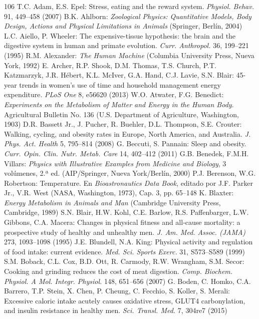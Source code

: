 \documentclass[12pt]{book}
\begin{document}
\begin{thebibliography}{106}
   T.C. Adam, E.S. Epel: Stress, eating and the reward system. \textit{Physiol. Behav.} 91, 449--458 (2007)
   B.K. Ahlborn: \textit{Zoological Physics: Quantitative Models, Body Design, Actions and Physical Limitations in Animals} (Springer, Berlín, 2004)
   L.C. Aiello, P. Wheeler: The expensive-tissue hypothesis: the brain and the digestive system in human and primate evolution. \textit{Curr. Anthropol.} 36, 199--221 (1995)
   R.M. Alexander: \textit{The Human Machine} (Columbia University Press, Nueva York, 1992)
   E. Archer, R.P. Shook, D.M. Thomas, T.S. Church, P.T. Katzmarzyk, J.R. Hébert, K.L. McIver, G.A. Hand, C.J. Lavie, S.N. Blair: 45-year trends in women's use of time and household management energy expenditure. \textit{PLoS One} 8, e56620 (2013)
   W.O. Atwater, F.G. Benedict: \textit{Experiments on the Metabolism of Matter and Energy in the Human Body}. Agricultural Bulletin No. 136 (U.S. Department of Agriculture, Washington, 1903)
   D.R. Bassett Jr., J. Pucher, R. Buehler, D.L. Thompson, S.E. Crouter: Walking, cycling, and obesity rates in Europe, North America, and Australia. \textit{J. Phys. Act. Health} 5, 795--814 (2008)
   G. Beccuti, S. Pannain: Sleep and obesity. \textit{Curr. Opin. Clin. Nutr. Metab. Care} 14, 402--412 (2011)
   G.B. Benedek, F.M.H. Villars: \textit{Physics with Illustrative Examples from Medicine and Biology}, 3 volúmenes, 2.ª ed. (AIP/Springer, Nueva York/Berlín, 2000)
   P.J. Berenson, W.G. Robertson: Temperature. En \textit{Bioastronautics Data Book}, editado por J.F. Parker Jr., V.R. West (NASA, Washington, 1973), Cap. 3, pp. 65--148
   K. Blaxter: \textit{Energy Metabolism in Animals and Man} (Cambridge University Press, Cambridge, 1989)
   S.N. Blair, H.W. Kohl, C.E. Barlow, R.S. Paffenbarger, L.W. Gibbons, C.A. Macera: Changes in physical fitness and all-cause mortality: a prospective study of healthy and unhealthy men. \textit{J. Am. Med. Assoc. (JAMA)} 273, 1093--1098 (1995)
   J.E. Blundell, N.A. King: Physical activity and regulation of food intake: current evidence. \textit{Med. Sci. Sports Exerc.} 31, S573--S589 (1999)
   S.M. Boback, C.L. Cox, B.D. Ott, R. Carmody, R.W. Wrangham, S.M. Secor: Cooking and grinding reduces the cost of meat digestion. \textit{Comp. Biochem. Physiol. A Mol. Integr. Physiol.} 148, 651--656 (2007)
   G. Boden, C. Homko, C.A. Barrero, T.P. Stein, X. Chen, P. Cheung, C. Fecchio, S. Koller, S. Merali: Excessive caloric intake acutely causes oxidative stress, GLUT4 carbonylation, and insulin resistance in healthy men. \textit{Sci. Transl. Med.} 7, 304re7 (2015)

\end{thebibliography}
\end{document}
